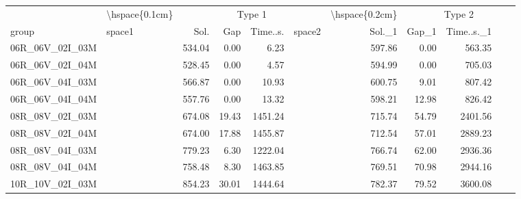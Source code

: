
\begin{tabular}{llrrrlrrr}
\toprule
\multicolumn{1}{c}{} & \multicolumn{1}{c}{\textbackslash{}hspace\{0.1cm\}} & \multicolumn{4}{c}{Type 1} & \multicolumn{1}{c}{\textbackslash{}hspace\{0.2cm\}} & \multicolumn{4}{c}{Type 2} \\
\cmidrule(l{3pt}r{3pt}){2-2} \cmidrule(l{3pt}r{3pt}){3-6} \cmidrule(l{3pt}r{3pt}){7-7} \cmidrule(l{3pt}r{3pt}){8-11}
group & space1 & Sol. & Gap & Time..s. & space2 & Sol.\_1 & Gap\_1 & Time..s.\_1\\
\midrule
06R\_06V\_02I\_03M & \hspace{0.1cm} & 534.04 & 0.00 & 6.23 & \hspace{0.2cm} & 597.86 & 0.00 & 563.35\\
06R\_06V\_02I\_04M & \hspace{0.1cm} & 528.45 & 0.00 & 4.57 & \hspace{0.2cm} & 594.99 & 0.00 & 705.03\\
06R\_06V\_04I\_03M & \hspace{0.1cm} & 566.87 & 0.00 & 10.93 & \hspace{0.2cm} & 600.75 & 9.01 & 807.42\\
06R\_06V\_04I\_04M & \hspace{0.1cm} & 557.76 & 0.00 & 13.32 & \hspace{0.2cm} & 598.21 & 12.98 & 826.42\\
\addlinespace
08R\_08V\_02I\_03M & \hspace{0.1cm} & 674.08 & 19.43 & 1451.24 & \hspace{0.2cm} & 715.74 & 54.79 & 2401.56\\
08R\_08V\_02I\_04M & \hspace{0.1cm} & 674.00 & 17.88 & 1455.87 & \hspace{0.2cm} & 712.54 & 57.01 & 2889.23\\
08R\_08V\_04I\_03M & \hspace{0.1cm} & 779.23 & 6.30 & 1222.04 & \hspace{0.2cm} & 766.74 & 62.00 & 2936.36\\
08R\_08V\_04I\_04M & \hspace{0.1cm} & 758.48 & 8.30 & 1463.85 & \hspace{0.2cm} & 769.51 & 70.98 & 2944.16\\
\addlinespace
10R\_10V\_02I\_03M & \hspace{0.1cm} & 854.23 & 30.01 & 1444.64 & \hspace{0.2cm} & 782.37 & 79.52 & 3600.08\\

\end{tabular}
